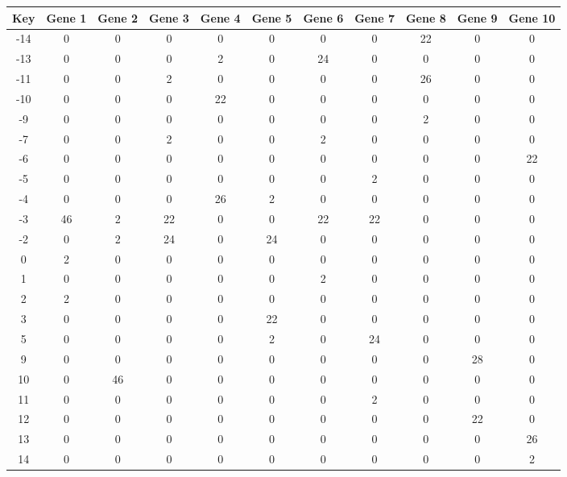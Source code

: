 \begin{tabular}{|c|c|c|c|c|c|c|c|c|c|c|}
\hline
Key & Gene 1 & Gene 2 & Gene 3 & Gene 4 & Gene 5 & Gene 6 & Gene 7 & Gene 8 & Gene 9 & Gene 10 \\
\hline
-14 & 0 & 0 & 0 & 0 & 0 & 0 & 0 & 22 & 0 & 0 \\
-13 & 0 & 0 & 0 & 2 & 0 & 24 & 0 & 0 & 0 & 0 \\
-11 & 0 & 0 & 2 & 0 & 0 & 0 & 0 & 26 & 0 & 0 \\
-10 & 0 & 0 & 0 & 22 & 0 & 0 & 0 & 0 & 0 & 0 \\
-9 & 0 & 0 & 0 & 0 & 0 & 0 & 0 & 2 & 0 & 0 \\
-7 & 0 & 0 & 2 & 0 & 0 & 2 & 0 & 0 & 0 & 0 \\
-6 & 0 & 0 & 0 & 0 & 0 & 0 & 0 & 0 & 0 & 22 \\
-5 & 0 & 0 & 0 & 0 & 0 & 0 & 2 & 0 & 0 & 0 \\
-4 & 0 & 0 & 0 & 26 & 2 & 0 & 0 & 0 & 0 & 0 \\
-3 & 46 & 2 & 22 & 0 & 0 & 22 & 22 & 0 & 0 & 0 \\
-2 & 0 & 2 & 24 & 0 & 24 & 0 & 0 & 0 & 0 & 0 \\
0 & 2 & 0 & 0 & 0 & 0 & 0 & 0 & 0 & 0 & 0 \\
1 & 0 & 0 & 0 & 0 & 0 & 2 & 0 & 0 & 0 & 0 \\
2 & 2 & 0 & 0 & 0 & 0 & 0 & 0 & 0 & 0 & 0 \\
3 & 0 & 0 & 0 & 0 & 22 & 0 & 0 & 0 & 0 & 0 \\
5 & 0 & 0 & 0 & 0 & 2 & 0 & 24 & 0 & 0 & 0 \\
9 & 0 & 0 & 0 & 0 & 0 & 0 & 0 & 0 & 28 & 0 \\
10 & 0 & 46 & 0 & 0 & 0 & 0 & 0 & 0 & 0 & 0 \\
11 & 0 & 0 & 0 & 0 & 0 & 0 & 2 & 0 & 0 & 0 \\
12 & 0 & 0 & 0 & 0 & 0 & 0 & 0 & 0 & 22 & 0 \\
13 & 0 & 0 & 0 & 0 & 0 & 0 & 0 & 0 & 0 & 26 \\
14 & 0 & 0 & 0 & 0 & 0 & 0 & 0 & 0 & 0 & 2 \\
\hline
\end{tabular}